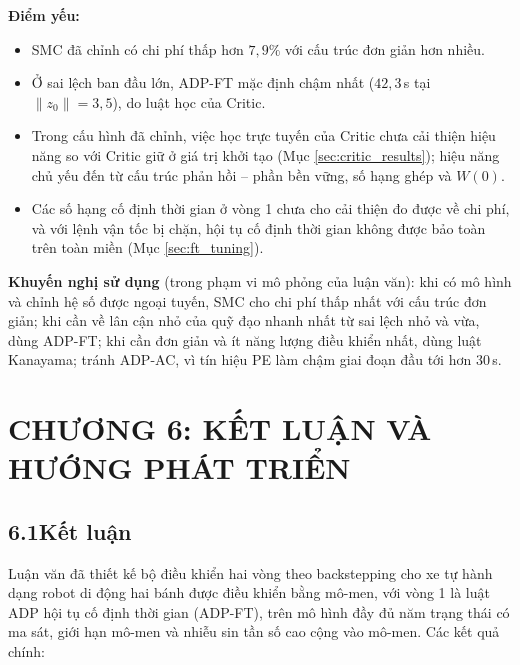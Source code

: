\documentclass[12pt,a4paper]{article}
\newcommand{\chapternum}{0}
\newcommand{\setchapter}[1]{%
  \renewcommand{\chapternum}{#1}%
  \setcounter{figure}{0}%
  \setcounter{table}{0}%
  \setcounter{equation}{0}%
  \renewcommand{\thefigure}{\chapternum.\arabic{figure}}%
  \renewcommand{\thetable}{\chapternum.\arabic{table}}%
  \renewcommand{\theequation}{\chapternum.\arabic{equation}}%
  \renewcommand{\theHfigure}{\chapternum.\arabic{figure}}%
  \renewcommand{\theHtable}{\chapternum.\arabic{table}}%
  \renewcommand{\theHequation}{\chapternum.\arabic{equation}}%
  \setcounter{dinhly}{0}\setcounter{bode}{0}\setcounter{hequa}{0}%
  \def\theHdinhly{\chapternum.\arabic{dinhly}}%
  \def\theHbode{\chapternum.\arabic{bode}}%
  \def\theHhequa{\chapternum.\arabic{hequa}}%
}
\begin{document}
\textbf{Điểm yếu:}
\begin{itemize}
    \item SMC đã chỉnh có chi phí thấp hơn $7{,}9\%$ với cấu trúc đơn giản hơn nhiều.
    \item Ở sai lệch ban đầu lớn, ADP-FT mặc định chậm nhất ($42{,}3$\,s tại $\|z_0\| = 3{,}5$), do luật học của Critic.
    \item Trong cấu hình đã chỉnh, việc học trực tuyến của Critic chưa cải thiện hiệu năng so với Critic giữ ở giá trị khởi tạo (Mục \ref{sec:critic_results}); hiệu năng chủ yếu đến từ cấu trúc phản hồi -- phần bền vững, số hạng ghép và $W(0)$.
    \item Các số hạng cố định thời gian ở vòng 1 chưa cho cải thiện đo được về chi phí, và với lệnh vận tốc bị chặn, hội tụ cố định thời gian không được bảo toàn trên toàn miền (Mục \ref{sec:ft_tuning}).
\end{itemize}

\textbf{Khuyến nghị sử dụng} (trong phạm vi mô phỏng của luận văn): khi có mô hình và chỉnh hệ số được ngoại tuyến, SMC cho chi phí thấp nhất với cấu trúc đơn giản; khi cần về lân cận nhỏ của quỹ đạo nhanh nhất từ sai lệch nhỏ và vừa, dùng ADP-FT; khi cần đơn giản và ít năng lượng điều khiển nhất, dùng luật Kanayama; tránh ADP-AC, vì tín hiệu PE làm chậm giai đoạn đầu tới hơn $30$\,s.


\newpage
\setchapter{6}
\section*{CHƯƠNG 6: KẾT LUẬN VÀ HƯỚNG PHÁT TRIỂN}

\subsection*{6.1\quad Kết luận}

Luận văn đã thiết kế bộ điều khiển hai vòng theo backstepping cho xe tự hành dạng robot di động hai bánh được điều khiển bằng mô-men, với vòng 1 là luật ADP hội tụ cố định thời gian (ADP-FT), trên mô hình đầy đủ năm trạng thái có ma sát, giới hạn mô-men và nhiễu sin tần số cao cộng vào mô-men. Các kết quả chính:
\end{document}
